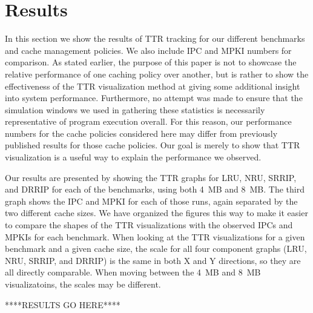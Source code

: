 \section{Results}

In this section we show the results of TTR tracking for our different
benchmarks and cache management policies.  We also include IPC and
MPKI numbers for comparison.  As stated
earlier, the purpose of this paper is not to showcase the relative
performance of one caching policy over another, but is rather to show
the effectiveness of the TTR visualization method at giving some
additional insight into system performance.
Furthermore, no attempt was made to ensure that the simulation windows
we used in gathering these statistics is necessarily representative of
program execution overall.  For this reason, our performance numbers
for the cache policies considered here may differ from previously
published
results for those cache policies.  Our goal is merely to show that TTR
visualization is a useful way to explain the performance we observed.

Our results are presented by showing the TTR graphs for LRU, NRU,
SRRIP, and DRRIP for each of the benchmarks, using both 4~MB and
8~MB.  The third graph shows the IPC and MPKI for each of those runs,
again separated by the two different cache sizes.  We have organized
the figures this way to make it easier to compare the shapes of the
TTR visualizations with the observed IPCs and MPKIs for each
benchmark.  When looking at the TTR visualizations for a given
benchmark and a given cache size, the scale for all four component
graphs (LRU, NRU, SRRIP, and DRRIP) is the same in both X and Y
directions, so they are all directly comparable.  When moving between
the 4~MB and 8~MB visualizatoins, the scales may be different.

****RESULTS GO HERE****

